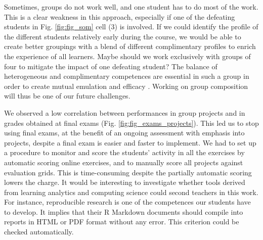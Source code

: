 \documentclass{aims}
\theoremstyle{definition}
\begin{document}
Sometimes, groups do not work well, and one student has to do most of
the work. This is a clear weakness in this approach, especially if one
of the defeating students in Fig. \ref {fig:fig_som} cell (3) is
involved. If we could identify the profile of the different students
relatively early during the course, we would be able to create better
groupings with a blend of different complimentary profiles to enrich the
experience of all learners. Maybe should we work exclusively with groups
of four to mitigate the impact of one defeating student? The balance of
heterogeneous and complimentary competences are essential in such a
group in order to create mutual emulation and efficacy
\cite{Mucchielli1996}. Working on group composition will thus be one of
our future challenges.

We observed a low correlation between performances in group projects and
in grades obtained at final exams (Fig. \ref {fig:fig_exams_projects}).
This led us to stop using final exams, at the benefit of an ongoing
assessment with emphasis into projects, despite a final exam is easier
and faster to implement. We had to set up a procedure to monitor and
score the students' activity in all the exercises by automatic scoring
online exercises, and to manually score all projects against evaluation
grids. This is time-consuming despite the partially automatic scoring
lowers the charge. It would be interesting to investigate whether tools
derived from learning analytics and computing science could second
teachers in this work. For instance, reproducible research is one of the
competences our students have to develop. It implies that their R
Markdown documents should compile into reports in HTML or PDF format
without any error. This criterion could be checked automatically.
\end{document}
